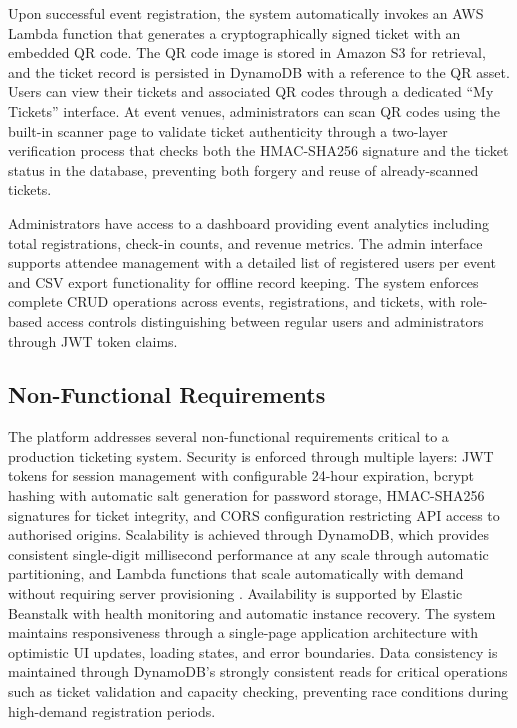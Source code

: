 \documentclass[conference]{IEEEtran}
\begin{document}
Upon successful event registration, the system automatically invokes an AWS Lambda function that generates a cryptographically signed ticket with an embedded QR code. The QR code image is stored in Amazon S3 for retrieval, and the ticket record is persisted in DynamoDB with a reference to the QR asset. Users can view their tickets and associated QR codes through a dedicated ``My Tickets'' interface. At event venues, administrators can scan QR codes using the built-in scanner page to validate ticket authenticity through a two-layer verification process that checks both the HMAC-SHA256 signature and the ticket status in the database, preventing both forgery and reuse of already-scanned tickets.

Administrators have access to a dashboard providing event analytics including total registrations, check-in counts, and revenue metrics. The admin interface supports attendee management with a detailed list of registered users per event and CSV export functionality for offline record keeping. The system enforces complete CRUD operations across events, registrations, and tickets, with role-based access controls distinguishing between regular users and administrators through JWT token claims.

\subsection{Non-Functional Requirements}

The platform addresses several non-functional requirements critical to a production ticketing system. Security is enforced through multiple layers: JWT tokens for session management with configurable 24-hour expiration, bcrypt hashing with automatic salt generation for password storage, HMAC-SHA256 signatures for ticket integrity, and CORS configuration restricting API access to authorised origins. Scalability is achieved through DynamoDB, which provides consistent single-digit millisecond performance at any scale through automatic partitioning, and Lambda functions that scale automatically with demand without requiring server provisioning \cite{aws2024dynamodb}. Availability is supported by Elastic Beanstalk with health monitoring and automatic instance recovery. The system maintains responsiveness through a single-page application architecture with optimistic UI updates, loading states, and error boundaries. Data consistency is maintained through DynamoDB's strongly consistent reads for critical operations such as ticket validation and capacity checking, preventing race conditions during high-demand registration periods.
\end{document}
